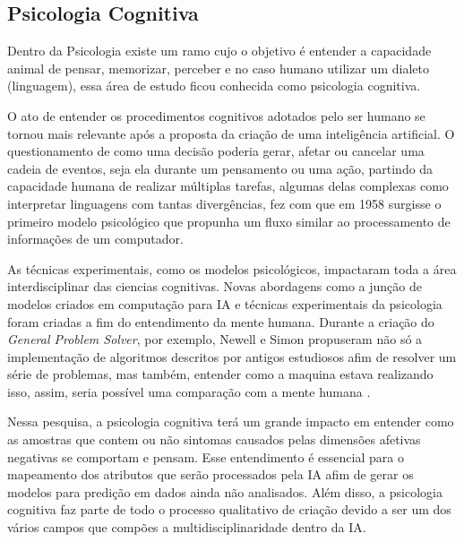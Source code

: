 \subsection{Psicologia Cognitiva}
Dentro da Psicologia existe um ramo cujo o objetivo é entender a capacidade animal de pensar, memorizar, perceber e no caso humano utilizar um dialeto (linguagem), essa área de estudo ficou conhecida como psicologia cognitiva.

O ato de entender os procedimentos cognitivos adotados pelo ser humano se tornou mais relevante após a proposta da criação de uma inteligência artificial. O questionamento de como uma decisão poderia gerar, afetar ou cancelar uma cadeia de eventos, seja ela durante um pensamento ou uma ação, partindo da capacidade humana de realizar múltiplas tarefas, algumas delas complexas como interpretar linguagens com tantas divergências, fez com que em 1958\cite[4-7]{broadbent1958perception} surgisse o primeiro modelo psicológico que propunha um fluxo similar ao processamento de informações de um computador.

As técnicas experimentais, como os modelos psicológicos, impactaram toda a área interdisciplinar das ciencias cognitivas. Novas abordagens como a junção de modelos criados em computação para IA e técnicas experimentais da psicologia foram criadas a fim do entendimento da mente humana. Durante a criação do \textit{General Problem Solver}, por exemplo, Newell e Simon propuseram não só a implementação de algoritmos descritos por antigos estudiosos afim de resolver um série de problemas, mas também, entender como a maquina estava realizando isso, assim, seria possível uma comparação com a mente humana \cite{newell1961gps, russell2003artificial}.

Nessa pesquisa, a psicologia cognitiva terá um grande impacto em entender como as amostras que contem ou não sintomas causados pelas dimensões afetivas negativas se comportam e pensam. Esse entendimento é essencial para o mapeamento dos atributos que serão processados pela IA afim de gerar os modelos para predição em dados ainda não analisados. Além disso, a psicologia cognitiva faz parte de todo o processo qualitativo de criação devido a ser um dos vários campos que compões a multidisciplinaridade dentro da IA.
